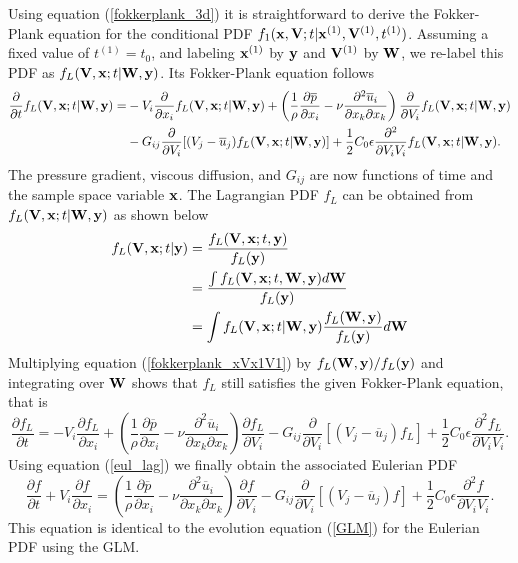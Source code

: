 \documentclass[oneside,a4paper,11pt]{report}
\newcommand{\pavg}{\overline{p}}
\newcommand{\uavg}{\overline{u}}
\begin{document}
Using equation (\ref{fokkerplank_3d}) it is straightforward to derive the Fokker-Plank equation for the conditional PDF $f_1(\mathbf{x},\mathbf{V};t | \mathbf{x}^{(1)}, \mathbf{V}^{(1)}, t^{(1)})$. Assuming a fixed value of $t^{(1)} = t_0$, and labeling $\mathbf{x}^{(1)}$ by $\mathbf{y}$ and $\mathbf{V}^{(1)}$ by $\mathbf{W}$, we re-label this PDF as $f_L(\mathbf{V}, \mathbf{x}; t | \mathbf{W}, \mathbf{y})$. Its Fokker-Plank equation follows
\begin{align}
\label{fokkerplank_xVx1V1}
\frac{\partial}{\partial t} f_L(\Vvec, \xvec; t | \Wvec, \yvec) = &-V_i\frac{\partial} {\partial x_i}f_L(\Vvec, \xvec; t | \Wvec, \yvec) + \left (\frac{1}{\rho} \frac{\partial \pavg}{\partial x_i}  -\nu \frac{\partial^2 \uavg_i}{\partial x_k \partial x_k} \right ) \frac{\partial}{\partial V_i}f_L(\Vvec, \xvec; t | \Wvec, \yvec) \nonumber \\
&- G_{ij}\frac{\partial}{\partial V_i} [(V_j - \uavg_j) f_L(\Vvec, \xvec; t | \Wvec, \yvec) ] + \frac{1}{2} C_0 \epsilon \frac{\partial ^2}{\partial V_i V_i} f_L(\Vvec, \xvec; t | \Wvec, \yvec ).
\end{align}
The pressure gradient, viscous diffusion, and $G_{ij}$ are now functions of time and the sample space variable $\mathbf{x}$. The Lagrangian PDF $f_L$ can be obtained from $f_L(\mathbf{V}, \mathbf{x}; t| \mathbf{W}, \mathbf{y})$ as shown below
\begin{align}
f_L(\mathbf{V}, \mathbf{x}; t | \mathbf{y}) &= \frac{ f_L(\mathbf{V}, \mathbf{x}; t, \mathbf{y})}{f_L(\mathbf{y})} \nonumber \\
& = \frac{ \int f_L(\mathbf{V}, \mathbf{x}; t, \mathbf{W}, \mathbf{y}) d\mathbf{W} }{f_L(\mathbf{y})} \nonumber \\
& =  \int f_L(\mathbf{V}, \mathbf{x}; t | \mathbf{W}, \mathbf{y}) \frac{ f_L(\mathbf{W}, \mathbf{y}) }{  f_L(\mathbf{y})  } d\mathbf{W} 
\end{align}
Multiplying equation (\ref{fokkerplank_xVx1V1}) by $f_L(\mathbf{W}, \mathbf{y}) / f_L(\mathbf{y})$ and integrating over $\mathbf{W}$ shows that $f_L$ still satisfies the given Fokker-Plank equation, that is
\begin{equation}
\frac{\partial f_L}{\partial t} = -V_i\frac{\partial f_L} {\partial x_i} + \left ( \frac{1}{\rho} \frac{\partial \pavg}{\partial x_i} - \nu \frac{\partial^2 \uavg_i}{\partial x_k \partial x_k} \right ) \frac{\partial f_L}{\partial V_i} - G_{ij}\frac{\partial}{\partial V_i} [(V_j - \uavg_j) f_L] + \frac{1}{2} C_0 \epsilon \frac{\partial ^2 f_L}{\partial V_i V_i}.
\end{equation}
Using equation (\ref{eul_lag}) we finally obtain the associated Eulerian PDF
\begin{equation}
\label{GLM2}
\frac{\partial f}{\partial t}  + V_i\frac{\partial f} {\partial x_i} =  \left ( \frac{1}{\rho} \frac{\partial \pavg}{\partial x_i} - \nu \frac{\partial^2 \uavg_i}{\partial x_k \partial x_k} \right ) \frac{\partial f}{\partial V_i} - G_{ij}\frac{\partial}{\partial V_i} [(V_j - \uavg_j) f] + \frac{1}{2} C_0 \epsilon \frac{\partial ^2 f}{\partial V_i V_i}.
\end{equation}
This equation is identical to the evolution equation (\ref{GLM}) for the Eulerian PDF using the GLM.
\end{document}
